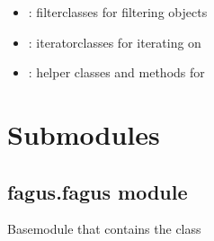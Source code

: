\documentclass[a4paper,10pt,english]{sphinxmanual}
\begin{document}
\begin{description}
\begin{itemize}
\item {}
\sphinxAtStartPar
{\hyperref[\detokenize{fagus.filters:module-fagus.filters}]{}}: filter\sphinxhyphen{}classes for filtering {\hyperref[\detokenize{fagus.fagus:fagus.fagus.Fagus}]{}}\sphinxhyphen{}objects

\item {}
\sphinxAtStartPar
{\hyperref[\detokenize{fagus.iterators:module-fagus.iterators}]{}}: iterator\sphinxhyphen{}classes for iterating on {\hyperref[\detokenize{fagus.fagus:fagus.fagus.Fagus}]{}}

\item {}
\sphinxAtStartPar
{\hyperref[\detokenize{fagus.utils:module-fagus.utils}]{}}: helper classes and methods for {\hyperref[\detokenize{fagus.fagus:fagus.fagus.Fagus}]{}}

\end{itemize}

\end{description}


\section{Submodules}
\label{\detokenize{fagus:submodules}}
\sphinxstepscope


\subsection{fagus.fagus module}
\label{\detokenize{fagus.fagus:module-fagus.fagus}}\label{\detokenize{fagus.fagus:fagus-fagus-module}}\label{\detokenize{fagus.fagus::doc}}
\sphinxAtStartPar
Base\sphinxhyphen{}module that contains the \sphinxhyphen{}class
\end{document}
